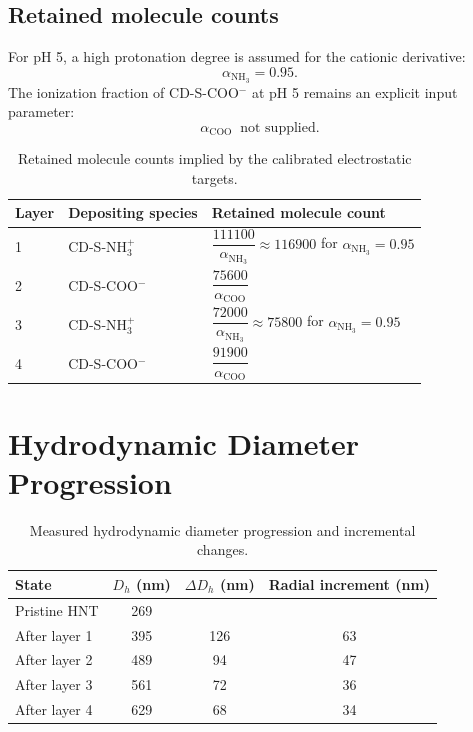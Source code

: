 \documentclass[11pt]{article}
\begin{document}
\subsection{Retained molecule counts}
For pH 5, a high protonation degree is assumed for the cationic derivative:
\[
\alpha_{\mathrm{NH_3}} = 0.95.
\]
The ionization fraction of CD-S-COO$^-$ at pH 5 remains an explicit input parameter:
\[
\alpha_{\mathrm{COO}} \;\; \text{not supplied}.
\]

\begin{table}[H]
\centering
\caption{Retained molecule counts implied by the calibrated electrostatic targets.}
\begin{tabular}{l l l}
\toprule
Layer & Depositing species & Retained molecule count \\
\midrule
1 & CD-S-NH$_3^+$ & $\dfrac{111100}{\alpha_{\mathrm{NH_3}}} \approx 116900$ for $\alpha_{\mathrm{NH_3}}=0.95$ \\
2 & CD-S-COO$^-$ & $\dfrac{75600}{\alpha_{\mathrm{COO}}}$ \\
3 & CD-S-NH$_3^+$ & $\dfrac{72000}{\alpha_{\mathrm{NH_3}}} \approx 75800$ for $\alpha_{\mathrm{NH_3}}=0.95$ \\
4 & CD-S-COO$^-$ & $\dfrac{91900}{\alpha_{\mathrm{COO}}}$ \\
\bottomrule
\end{tabular}
\label{tab:molecule_counts}
\end{table}

\section{Hydrodynamic Diameter Progression}

\begin{table}[H]
\centering
\caption{Measured hydrodynamic diameter progression and incremental changes.}
\begin{tabular}{l
                S[table-format=3.0]
                S[table-format=3.0]
                S[table-format=2.0]}
\toprule
State & {$D_h$ (nm)} & {$\Delta D_h$ (nm)} & {Radial increment (nm)} \\
\midrule
Pristine HNT & 269 & {} & {} \\
After layer 1 & 395 & 126 & 63 \\
After layer 2 & 489 & 94 & 47 \\
After layer 3 & 561 & 72 & 36 \\
After layer 4 & 629 & 68 & 34 \\
\bottomrule
\end{tabular}
\label{tab:dls}
\end{table}
\end{document}
